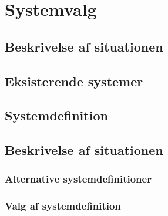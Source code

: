 \section{Systemvalg}
\subsection{Beskrivelse af situationen}
\subsection{Eksisterende systemer}
\subsection{Systemdefinition}
\subsection{Beskrivelse af situationen}
\subsubsection{Alternative systemdefinitioner}
\subsubsection{Valg af systemdefinition}
